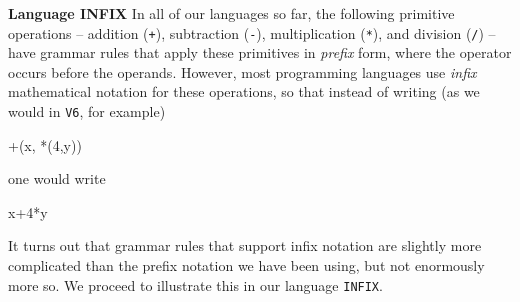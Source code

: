 \begin{minipage}[t]{\sw}
\slidenumber
\LARGE
{\bf Language INFIX}\exx
In all of our languages so far, the following primitive operations --
addition (\verb'+'),
subtraction (\verb'-'),
multiplication (\verb'*'),
and division (\verb'/') --
have grammar rules that apply these primitives in {\em prefix} form,
where the operator occurs before the operands.
However, most programming languages use {\em infix} mathematical notation
for these operations,
so that instead of writing (as we would in \verb'V6', for example)
\begin{qv}
+(x, *(4,y))
\end{qv}
one would write
\begin{qv}
x+4*y
\end{qv}
It turns out that grammar rules that support infix notation
are slightly more complicated than the prefix notation we have been using,
but not enormously more so.
We proceed to illustrate this in our language \verb'INFIX'.\exx
\end{minipage}
